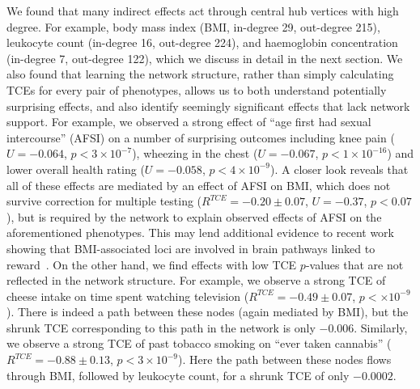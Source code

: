 \documentclass{article}
\begin{document}
We found that many indirect effects act through central hub vertices with high degree. For example,
body mass index (BMI, in-degree 29, out-degree 215), leukocyte count (in-degree 16, out-degree 224), and
haemoglobin concentration (in-degree 7, out-degree 122), which we discuss in detail in the next
section. We also found that learning the network structure, rather than simply calculating TCEs
for every pair of phenotypes, allows us to both understand potentially surprising effects, and
also identify seemingly significant effects that lack network support.
For example, we observed a strong effect of ``age first had sexual intercourse'' (AFSI) on a number
of surprising outcomes including knee pain ($U = -0.064$, $p < 3 \times 10^{-7}$),
wheezing in the chest ($U = -0.067$, $p < 1 \times 10^{-16}$) and
lower overall health rating ($U = -0.058$, $p < 4 \times 10^{-9}$). A closer look reveals
that all of these effects are mediated by an effect of AFSI on BMI, which does not survive
correction for multiple testing ($R^{TCE} = -0.20 \pm 0.07$, $U = -0.37$, $p < 0.07$),
but is required by the network to explain observed effects of AFSI on the aforementioned phenotypes.
This may lend additional evidence to recent work showing that BMI-associated loci are involved
in brain pathways linked to reward~\cite{Ndiaye2020}.
On the other hand, we find effects with low TCE $p$-values that are not reflected in
the network structure. For example, we observe a strong TCE of cheese intake on time spent watching television
($R^{TCE} = -0.49 \pm 0.07$, $p <  \times 10^{-9}$).
There is indeed a path between these nodes (again mediated by BMI), but the shrunk TCE corresponding
to this path in the network is only $-0.006$. Similarly, we observe a strong TCE of 
past tobacco smoking on ``ever taken cannabis'' ($R^{TCE} = -0.88 \pm 0.13$, $p < 3 \times 10^{-9}$).
Here the path between these nodes flows through BMI, followed by leukocyte count, for a shrunk TCE of
only $-0.0002$.
 
\end{document}
